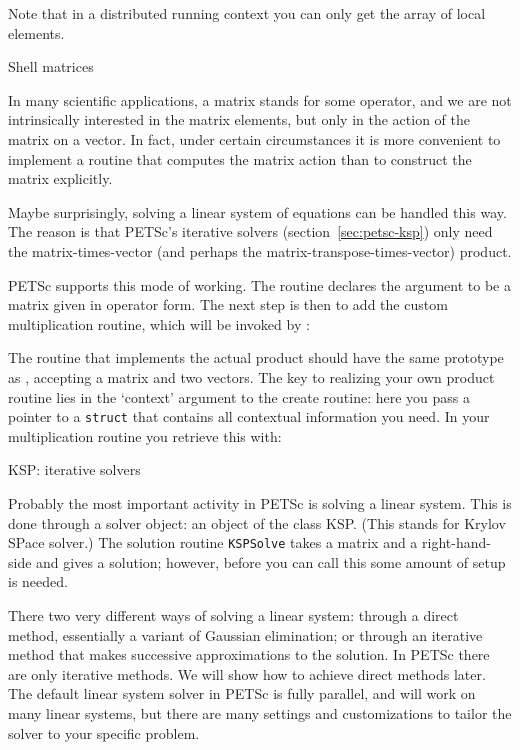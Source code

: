 Note that in a distributed running context you can only get the array of local elements.

 {Shell matrices}

In many scientific applications, a matrix stands for some operator,
and we are not intrinsically interested in the matrix elements, but
only in the action of the matrix on a vector. In fact, under certain
circumstances it is more convenient to implement a routine that
computes the matrix action than to construct the matrix explicitly.

Maybe surprisingly, solving a linear system of equations can be
handled this way. The reason is that PETSc's iterative solvers
(section~\ref{sec:petsc-ksp}) only need the matrix-times-vector (and perhaps
the matrix-transpose-times-vector) product.

PETSc supports this mode of working. The routine 
%
%
declares the argument to be a matrix given in operator form.
The next step is then to add the custom multiplication routine, which
will be invoked by :
%

The routine that implements the actual product should have the same
prototype as , accepting a matrix and two
vectors. The key to realizing your own product routine lies in the
`context' argument to the create routine: here you pass a pointer to a
\lstinline{struct} that contains all contextual information you
need. In your multiplication routine you retrieve this with:
%

 {KSP: iterative solvers}
\label{sec:petsc-ksp}

Probably the most important activity in PETSc is solving a linear
system. This is done through a solver object: an object of the class
KSP. (This stands for Krylov SPace solver.) The solution routine
\lstinline{KSPSolve} takes a matrix and a right-hand-side and gives a
solution; however, before you can call this some amount of setup is needed.

There two very different ways of solving a
linear system: through a direct method, essentially a variant of
Gaussian elimination; or through an iterative method that makes
successive approximations to the solution. In PETSc there are only
iterative methods. We will show how to achieve direct methods later.
The default linear system solver in PETSc is fully parallel, and will
work on many linear systems, but there are many settings and
customizations to tailor the solver to your specific problem.

